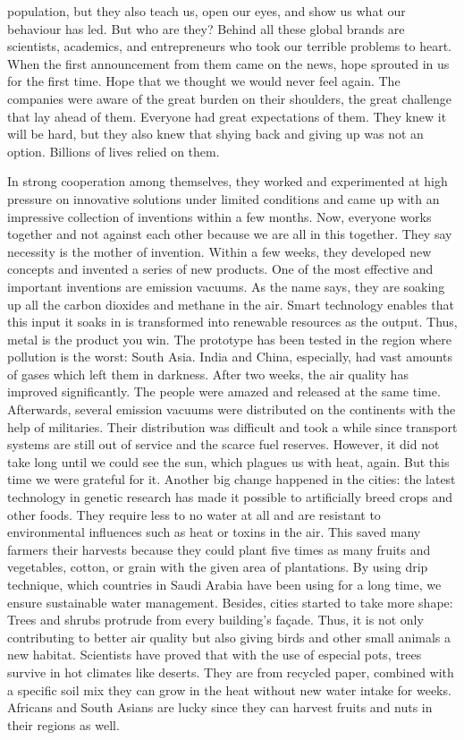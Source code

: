 \documentclass[]{book}
\begin{document}
population, but they also teach us, open our eyes, and show us what our behaviour has led. But who are they?
Behind all these global brands are scientists, academics, and entrepreneurs who took our terrible problems to heart. When the first announcement from them came on the news, hope sprouted in us for the first time. Hope that we thought we would never feel again. The companies were aware of the great burden on their shoulders, the great challenge that lay ahead of them. Everyone had great expectations of them. They knew it will be hard, but they also knew that shying back and giving up was not an option. Billions of lives relied on them.

In strong cooperation among themselves, they worked and experimented at high pressure on innovative solutions under limited conditions and came up with an impressive collection of inventions within a few months. Now, everyone works together and not against each other because we are all in this together. They say necessity is the mother of invention. Within a few weeks, they developed new concepts and invented a series of new products. One of the most effective and important inventions are emission vacuums. As the name says, they are soaking up all the carbon dioxides and methane in the air. Smart technology enables that this input it soaks in is transformed into renewable resources as the output. Thus, metal is the product you win. The prototype has been tested in the region where pollution is the worst: South Asia. India and China, especially, had vast amounts of gases which left them in darkness. After two weeks, the air quality has improved significantly. The people were amazed and released at the same time. Afterwards, several emission vacuums were distributed on the continents with the help of militaries. Their distribution was difficult and took a while since transport systems are still out of service and the scarce fuel reserves. However, it did not take long until we could see the sun, which plagues us with heat, again. But this time we were grateful for it. Another big change happened in the cities: the latest technology in genetic research has made it possible to artificially breed crops and other foods. They require less to no water at all and are resistant to environmental influences such as heat or toxins in the air. This saved many farmers their harvests because they could plant five times as many fruits and vegetables, cotton, or grain with the given area of plantations. By using drip technique, which countries in Saudi Arabia have been using for a long time, we ensure sustainable water management. Besides, cities started to take more shape: Trees and shrubs protrude from every building's façade. Thus, it is not only contributing to better air quality but also giving birds and other small animals a new habitat. Scientists have proved that with the use of especial pots, trees survive in hot climates like deserts. They are from recycled paper, combined with a specific soil mix they can grow in the heat without new water intake for weeks. Africans and South Asians are lucky since they can harvest fruits and nuts in their regions as well.
\end{document}
